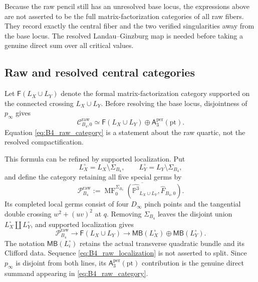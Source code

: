 \documentclass[11pt]{amsart}
\theoremstyle{definition}
\theoremstyle{remark}
\DeclareMathOperator{\MF}{MF}
\newcommand{\MBcat}[1]{\mathsf{MB}(#1)}
\newcommand{\Aper}[2]{\mathsf{A}^{\mathrm{per}}_{#2}(#1)}
\newcommand{\FormalCat}[1]{\mathsf{F}(#1)}
\newcommand{\CrawB}{\mathcal C^{\mathrm{raw}}_{B_4,0}}
\begin{document}
Because the raw pencil still has an unresolved base locus, the expressions
above are not asserted to be the full matrix-factorization categories of all
raw fibers.  They record exactly the central fiber and the two verified
singularities away from the base locus.  The resolved Landau--Ginzburg map is
needed before taking a genuine direct sum over all critical values.

\subsection{Raw and resolved central categories}

Let $\FormalCat{L_X\cup L_Y}$ denote the formal matrix-factorization category
supported on the connected crossing $L_X\cup L_Y$.  Before resolving the
base locus, disjointness of $p_\infty$ gives
\begin{equation}
\label{eq:B4_raw_category}
\CrawB
\simeq
\FormalCat{L_X\cup L_Y}
\oplus \Aper{\mathrm{pt}}{3}.
\end{equation}
Equation \eqref{eq:B4_raw_category} is a statement about the raw quartic, not
the resolved compactification.

This formula can be refined by supported localization.  Put
\[
L_X^\circ=L_X\setminus\Sigma_{B_4},
\qquad
L_Y^\circ=L_Y\setminus\Sigma_{B_4},
\]
and define the category retaining all five special germs by
\[
\mathcal P^{\mathrm{raw}}_{B_4}
:=
\overline{\MF^{\Sigma_{B_4}}_0\!\left(
\widehat{\mathbb P^3}_{L_X\cup L_Y},\widehat F_{B_4,0}
\right)}.
\]
Its completed local germs consist of four $D_\infty$ pinch points and the
tangential double crossing $w^2+(uv)^2$ at $q$.  Removing
$\Sigma_{B_4}$ leaves the disjoint union
$L_X^\circ\amalg L_Y^\circ$, and supported localization gives
\begin{equation}
\label{eq:B4_raw_localization}
\mathcal P^{\mathrm{raw}}_{B_4}
\longrightarrow
\FormalCat{L_X\cup L_Y}
\longrightarrow
\MBcat{L_X^\circ}\oplus\MBcat{L_Y^\circ}.
\end{equation}
The notation $\MBcat{L_i^\circ}$ retains the actual transverse quadratic
bundle and its Clifford data.  Sequence \eqref{eq:B4_raw_localization} is not
asserted to split.  Since $p_\infty$ is disjoint from both lines, its
$\Aper{\mathrm{pt}}{3}$ contribution is the genuine direct summand appearing
in \eqref{eq:B4_raw_category}.
\end{document}

